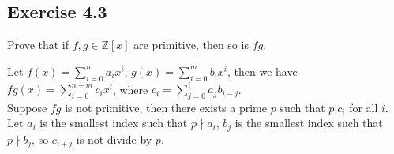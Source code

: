 \documentclass[11pt]{ctexart}
\theoremstyle{definition}
\numberwithin{equation}{section}
\newcommand{\ZZ}{\mathbb{Z}}
\theoremstyle{definition}
\theoremstyle{remark}
\begin{document}
\subsection{Exercise 4.3}
Prove that if $f,g\in \ZZ[x]$ are primitive, then so is $fg$.
\begin{aaa}
    Let $f(x)=\sum_{i=0}^n a_ix^i$, $g(x)=\sum_{i=0}^m b_ix^i$, then we have $fg(x)=\sum_{i=0}^{n+m}c_ix^i$, where $c_i=\sum_{j=0}^i a_jb_{i-j}$. \\
    Suppose $fg$ is not primitive, then there exists a prime $p$ such that $p|c_i$ for all $i$. Let $a_i$ is the smallest index such that $p\nmid a_i$, $b_j$ is the smallest index such that $p\nmid b_j$, so $c_{i+j}$ is not divide by $p$.
\end{aaa}
\end{document}
